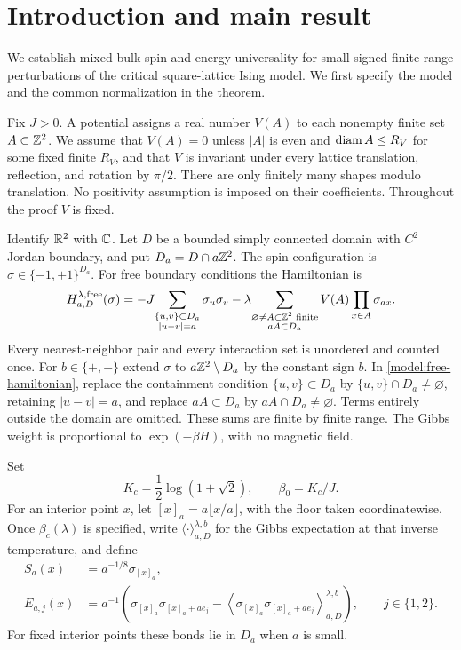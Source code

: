 \section{Introduction and main result}\label{sec:model}

We establish mixed bulk spin and energy universality for small signed
finite-range perturbations of the critical square-lattice Ising model.
We first specify the model and the common normalization in the theorem.


Fix $J>0$. A potential assigns a real number $V(A)$ to each nonempty
finite set $A\subset\mathbb Z^2$. We assume that $V(A)=0$ unless $|A|$ is even
and $\operatorname{diam} A\le R_V$ for some fixed finite $R_V$, and that $V$ is
invariant under every lattice translation, reflection, and rotation by
$\pi/2$. There are only finitely many shapes modulo translation. No
positivity assumption is imposed on their coefficients. Throughout the
proof $V$ is fixed.

Identify $\mathbb R^2$ with $\mathbb C$. Let $D$ be a bounded simply connected domain
with $C^2$ Jordan boundary, and put $D_a=D\cap a\mathbb Z^2$. The spin
configuration is $\sigma\in\{-1,+1\}^{D_a}$. For free boundary
conditions the Hamiltonian is
\begin{equation}\label{model:free-hamiltonian}
 H_{a,D}^{\lambda,\mathrm{free}}(\sigma)
 =-J\!\sum_{\substack{\{u,v\}\subset D_a\\|u-v|=a}}
       \sigma_u\sigma_v
  -\lambda\!\sum_{\substack{\varnothing\ne A\subset\mathbb Z^2\text{ finite}\\aA\subset D_a}}
       V(A)\prod_{x\in A}\sigma_{ax}.
\end{equation}
Every nearest-neighbor pair and every interaction set is unordered and
counted once. For $b\in\{+,-\}$ extend $\sigma$ to $a\mathbb Z^2\setminus D_a$
by the constant sign $b$. In \eqref{model:free-hamiltonian}, replace the
containment condition $\{u,v\}\subset D_a$ by
$\{u,v\}\cap D_a\ne\varnothing$, retaining $|u-v|=a$, and replace
$aA\subset D_a$ by $aA\cap D_a\ne\varnothing$. Terms entirely outside the
domain are omitted. These sums are finite by finite range. The Gibbs
weight is proportional to $\exp(-\beta H)$, with no magnetic field.

Set
\[
 K_c=\frac12\log(1+\sqrt2),\qquad \beta_0=K_c/J.
\]
For an interior point $x$, let $[x]_a=a\lfloor x/a\rfloor$, with the
floor taken coordinatewise. Once $\beta_c(\lambda)$ is specified, write
$\langle\cdot\rangle_{a,D}^{\lambda,b}$ for the Gibbs expectation at
that inverse temperature, and define
\begin{align}
 S_a(x)&=a^{-1/8}\sigma_{[x]_a},\label{model:spin}\\
 E_{a,j}(x)&=a^{-1}\left(\sigma_{[x]_a}\sigma_{[x]_a+ae_j}
       -\left\langle\sigma_{[x]_a}\sigma_{[x]_a+ae_j}
          \right\rangle_{a,D}^{\lambda,b}\right),
       \qquad j\in\{1,2\}.\label{model:energy}
\end{align}
For fixed interior points these bonds lie in $D_a$ when $a$ is small.

